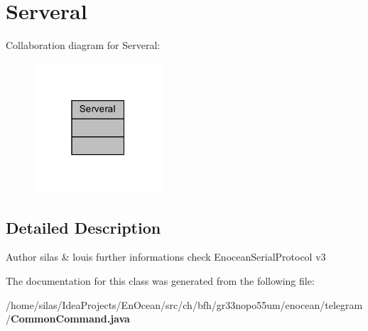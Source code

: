 \section{Serveral}
\label{classServeral}


Collaboration diagram for Serveral\+:\nopagebreak
\begin{figure}[H]
\begin{center}
\leavevmode
\includegraphics[width=135pt]{d1/deb/classServeral__coll__graph}
\end{center}
\end{figure}


\subsection{Detailed Description}
\begin{DoxyAuthor}{Author}
silas \& louis further informations check Enocean\+Serial\+Protocol v3 
\end{DoxyAuthor}


The documentation for this class was generated from the following file\+:\begin{DoxyCompactItemize}
\item 
/home/silas/\+Idea\+Projects/\+En\+Ocean/src/ch/bfh/gr33nopo55um/enocean/telegram/{\bf Common\+Command.\+java}\end{DoxyCompactItemize}
